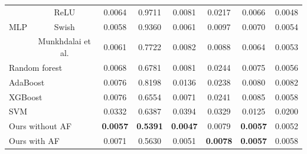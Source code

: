 \documentclass{ieeeaccess}
\begin{document}
\begin{table}[t]
\begin{tabular*}{0.9\textwidth}{c @{\extracolsep{\fill}} ccccccc}
           & ReLU & 0.0064 & 0.9711 & 0.0081 & 0.0217 & 0.0066 & 0.0048 \\
    MLP    & Swish & 0.0058 & 0.9360 & 0.0061 & 0.0097 & 0.0070 & 0.0054 \\
           & Munkhdalai et al. & 0.0061 & 0.7722 & 0.0082 & 0.0088 & 0.0064 & 0.0053 \\

    \hline

    \multicolumn{2}{l}{Random forest} & 0.0068 & 0.6781 & 0.0081 & 0.0244 & 0.0075 & 0.0056 \\
    \multicolumn{2}{l}{AdaBoost} & 0.0076 & 0.8198 & 0.0136 & 0.0238 & 0.0080 & 0.0082 \\
    \multicolumn{2}{l}{XGBoost} & 0.0076 & 0.6554 & 0.0071 & 0.0241 & 0.0085 & 0.0058 \\
    \multicolumn{2}{l}{SVM} & 0.0332 & 0.6387 & 0.0394 & 0.0329 & 0.0125 & 0.0200 \\

    \hline
    \hline

    \multicolumn{2}{l}{Ours without AF}        & \textbf{0.0057}          & \textbf{0.5391}          & \textbf{0.0047}          & 0.0079          & \textbf{0.0057}          & 0.0052 \\
    \multicolumn{2}{l}{Ours with AF}           & 0.0071                   & 0.5630                   & 0.0051                   & \textbf{0.0078} & \textbf{0.0057}          & 0.0058 \\

    \hline

  \end{tabular*}
  \label{table:comparison-rmse}
\end{table}
\end{document}
